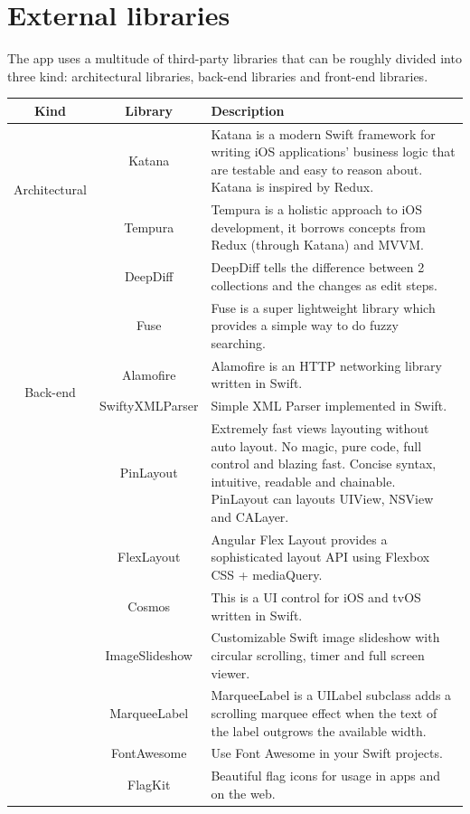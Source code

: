 \documentclass[a4paper, 11pt, parskip=half]{scrreprt}
\theoremstyle{definition}
\begin{document}
\section{External libraries}

The app uses a multitude of third-party libraries that can be roughly divided into three kind: architectural libraries, back-end libraries and front-end libraries.

\begin{table}[h]
    \centering
    \def\arraystretch{1.3}
    \begin{tabular}{|c|c|m{9cm}|}
        \hline
        \textbf{Kind} & \textbf{Library} & \textbf{Description} \\ \hline
        \multirow{2}{*}{Architectural} & Katana & Katana is a modern Swift framework for writing iOS applications' business logic that are testable and easy to reason about. Katana is inspired by Redux. \\ \cline{2-3}
        & Tempura & Tempura is a holistic approach to iOS development, it borrows concepts from Redux (through Katana) and MVVM. \\ \hline
        \multirow{5}{*}{Back-end} & DeepDiff & DeepDiff tells the difference between 2 collections and the changes as edit steps. \\ \cline{2-3}
        & Fuse & Fuse is a super lightweight library which provides a simple way to do fuzzy searching. \\ \cline{2-3}
        & Alamofire & Alamofire is an HTTP networking library written in Swift. \\ \cline{2-3}
        & SwiftyXMLParser & Simple XML Parser implemented in Swift. \\ \hline
        \multirow{7}{*}{Front-end} & PinLayout & Extremely fast views layouting without auto layout. No magic, pure code, full control and blazing fast. Concise syntax, intuitive, readable and chainable. PinLayout can layouts UIView, NSView and CALayer. \\ \cline{2-3}
        & FlexLayout & Angular Flex Layout provides a sophisticated layout API using Flexbox CSS + mediaQuery. \\ \cline{2-3}
        & Cosmos & This is a UI control for iOS and tvOS written in Swift. \\ \cline{2-3}
        & ImageSlideshow & Customizable Swift image slideshow with circular scrolling, timer and full screen viewer. \\ \cline{2-3}
        & MarqueeLabel & MarqueeLabel is a UILabel subclass adds a scrolling marquee effect when the text of the label outgrows the available width. \\ \cline{2-3}
        & FontAwesome & Use Font Awesome in your Swift projects. \\ \cline{2-3}
        & FlagKit & Beautiful flag icons for usage in apps and on the web. \\ \hline
    \end{tabular}
\end{table}
\end{document}
